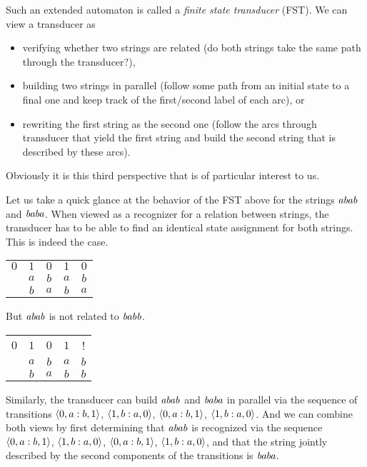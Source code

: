 Such an extended automaton is called a \emph{finite state transducer} (FST).
We can view a transducer as 
%
\begin{itemize}
    \item verifying whether two strings are related (do both strings take the same path through the transducer?),
    \item building two strings in parallel (follow some path from an initial state to a final one and keep track of the first\slash second label of each arc), or
    \item rewriting the first string as the second one (follow the arcs through transducer that yield the first string and build the second string that is described by these arcs).
\end{itemize}
%
Obviously it is this third perspective that is of particular interest to us.
%
\begin{examplebox}
    Let us take a quick glance at the behavior of the FST above for the strings $\mathit{abab}$ and $\mathit{baba}$.
    When viewed as a recognizer for a relation between strings, the transducer has to be able to find an identical state assignment for both strings.
    This is indeed the case.
    \begin{center}
        \begin{tabular}{ccccc}
            $0$ & $1$ & $0$ & $1$ & $0$\\
                & $a$ & $b$ & $a$ & $b$\\
                & $b$ & $a$ & $b$ & $a$\\
        \end{tabular}
    \end{center}
    But $\mathit{abab}$ is not related to $\mathit{babb}$.
    \begin{center}
        \begin{tabular}{ccccc}
            $0$ & $1$ & $0$ & $1$ & !\\
                & $a$ & $b$ & $a$ & $b$\\
                & $b$ & $a$ & $b$ & $b$\\
        \end{tabular}
    \end{center}
    
    Similarly, the transducer can build $\mathit{abab}$ and $\mathit{baba}$ in parallel via the sequence of transitions $\left \langle 0,a:b,1 \right \rangle $, $\left \langle 1,b:a,0 \right \rangle $, $\left \langle 0,a:b,1 \right \rangle $, $\left \langle 1,b:a,0 \right \rangle $.
    And we can combine both views by first determining that $\mathit{abab}$ is recognized via the sequence $\left \langle 0,a:b,1 \right \rangle $, $\left \langle 1,b:a,0 \right \rangle $, $\left \langle 0,a:b,1 \right \rangle $, $\left \langle 1,b:a,0 \right \rangle $, and that the string jointly described by the second components of the transitions is $\mathit{baba}$.
\end{examplebox}

